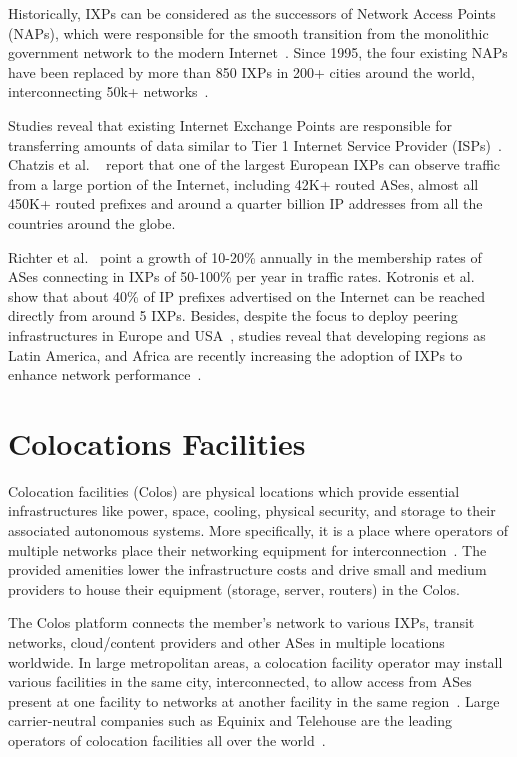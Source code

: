 	Historically, IXPs can be considered as the successors of Network Access Points (NAPs), which were responsible for the smooth transition from the monolithic government network to the modern Internet~\cite{Chatzis:2013}. Since 1995, the four existing NAPs have been replaced by more than 850 IXPs in 200+ cities around the world, interconnecting 50k+ networks~\cite{internetexchangemap, Ager:2012, Giotsas:2015:MPI:2716281.2836122}.

	Studies reveal that existing Internet Exchange Points are responsible for transferring amounts of data similar to Tier 1 Internet Service Provider (ISPs)~\cite{Ager:2012}. Chatzis et al. ~\cite{Chatzis:2013:BUL:2504730.2504746} report that one of the largest European IXPs can observe traffic from a large portion of the Internet, including 42K+ routed ASes, almost all 450K+ routed prefixes and around a quarter billion IP addresses from all the countries around the globe. 

	Richter et al.~\cite{Richter:2014} point a growth of 10-20\% annually in the membership rates of ASes connecting in IXPs of 50-100\% per year in traffic rates. Kotronis et al.~\cite{Kotronis:2015:IPI:2745844.2745877} show that about 40\% of IP prefixes advertised on the Internet can be reached directly from around 5 IXPs. Besides, despite the focus to deploy peering infrastructures in Europe and USA~\cite{Chatzis:2013, Chatzis:2015:QVO:2717646.2717650}, studies reveal that developing regions as Latin America, and Africa are recently increasing the adoption of IXPs to enhance network performance~\cite{DissectingBrazilianIXP, Fanou:2017:ICC:3131365.3131394}.


	\section{Colocations Facilities}
	\label{subsec:colos}

	Colocation facilities (Colos) are physical locations which provide essential infrastructures like power, space, cooling, physical security, and storage to their associated autonomous systems. More specifically, it is a place where operators of multiple networks place their networking equipment for interconnection~\cite{BITAG}. The provided amenities lower the infrastructure costs and drive small and medium providers to house their equipment (storage, server, routers) in the Colos.

	The Colos platform connects the member's network to various IXPs, transit networks, cloud/content providers and other ASes in multiple locations worldwide. In large metropolitan areas, a colocation facility operator may install various facilities in the same city, interconnected, to allow access from ASes present at one facility to networks at another facility in the same region~\cite{Giotsas:2015:MPI:2716281.2836122}. Large carrier-neutral companies such as Equinix and Telehouse are the leading operators of colocation facilities all over the world~\cite{Kotronis:2017:STC:3131365.3131388}. 

	


	